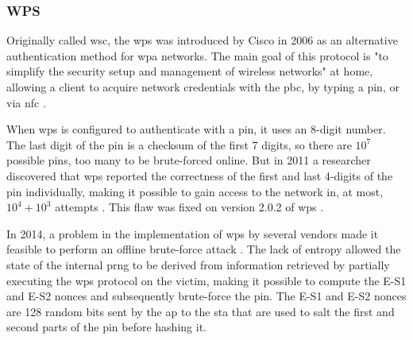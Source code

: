 \subsubsection{WPS}

Originally called \gls{wsc}, the \gls{wps} was introduced by Cisco in 2006 as an alternative authentication method for \gls{wpa} networks. The main goal of this protocol is "to simplify the security setup and management of wireless networks" at home, allowing a client to acquire network credentials with the \gls{pbc}, by typing a \gls{pin}, or via \gls{nfc} \cite{wps_spec}.

When \gls{wps} is configured to authenticate with a \gls{pin}, it uses an 8-digit number. The last digit of the \gls{pin} is a checksum of the first 7 digits, so there are \( 10^7 \) possible \gls{pin}s, too many to be brute-forced online. But in 2011 a researcher discovered that \gls{wps} reported the correctness of the first and last 4-digits of the \gls{pin} individually, making it possible to gain access to the network in, at most, \( 10^4 + 10^3 \) attempts \cite{viehboeck}. This flaw was fixed on version 2.0.2 of \gls{wps} \cite{wps_spec}.

In 2014, a problem in the implementation of \gls{wps} by several vendors made it feasible to perform an offline brute-force attack \cite{pixiedust}. The lack of entropy allowed the state of the internal \gls{prng} to be derived from information retrieved by partially executing the \gls{wps} protocol on the victim, making it possible to compute the E-S1 and E-S2 nonces and subsequently brute-force the \gls{pin}. The E-S1 and E-S2 nonces are 128 random bits sent by the \gls{ap} to the \gls{sta} that are used to salt the first and second parts of the \gls{pin} before hashing it.
